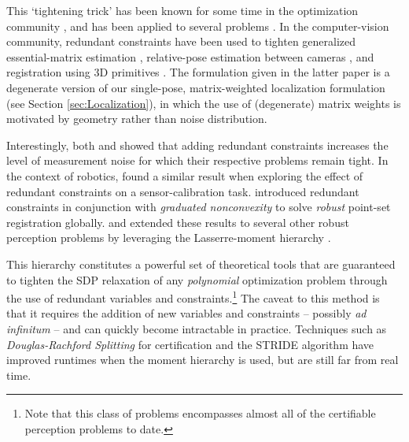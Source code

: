 \documentclass[lettersize,journal]{IEEEtran}
\begin{document}
This `tightening trick' has been known for some time in the optimization community \cite{nesterovSemidefiniteProgrammingRelaxations2000}, and has been applied to several problems \cite{ruizUsingRedundancyStrengthen2011, parriloSemidefiniteProgrammingRelaxations2003a}. In the computer-vision community, redundant constraints have been used to tighten generalized essential-matrix estimation \cite{zhaoCertifiablyGloballyOptimal2020}, relative-pose estimation between cameras \cite{garcia-salgueroTighterRelaxationRelative2022, brialesCertifiablyGloballyOptimal2018}, and registration using 3D primitives \cite{brialesConvexGlobal3D2017}. The formulation given in the latter paper is a degenerate version of our single-pose, matrix-weighted localization formulation (see Section \ref{sec:Localization}), in which the use of (degenerate) matrix weights is motivated by geometry rather than noise distribution. 

Interestingly, both \cite{garcia-salgueroTighterRelaxationRelative2022} and \cite{brialesCertifiablyGloballyOptimal2018} showed that adding redundant constraints increases the level of measurement noise for which their respective problems remain tight. In the context of robotics, \cite{wiseCertifiablyOptimalMonocular2020} found a similar result when exploring the effect of redundant constraints on a sensor-calibration task. \cite{yangTEASERFastCertifiable2021} introduced redundant constraints in conjunction with \emph{graduated nonconvexity} \cite{yangGraduatedNonConvexityRobust2020} to solve \emph{robust} point-set registration globally. \cite{yangOneRingRule2020} and \cite{yangCertifiablyOptimalOutlierRobust2023} extended these results to several other robust perception problems by leveraging the Lasserre-moment hierarchy \cite{henrionMomentSOSHierarchyLectures2021,lasserreGlobalOptimizationPolynomials2001}. 

This hierarchy constitutes a powerful set of theoretical tools that are guaranteed to tighten the SDP relaxation of any \emph{polynomial} optimization problem through the use of redundant variables and constraints.\footnote{Note that this class of problems encompasses almost all of the certifiable perception problems to date.} The caveat to this method is that it requires the addition of new variables and constraints -- possibly \emph{ad infinitum} -- and can quickly become intractable in practice. Techniques such as \emph{Douglas-Rachford Splitting} for certification \cite{yangTEASERFastCertifiable2021} and the STRIDE algorithm \cite{yangCertifiablyOptimalOutlierRobust2023} have improved runtimes when the moment hierarchy is used, but are still far from real time. 
\end{document}

